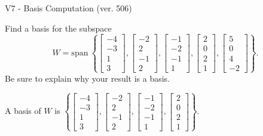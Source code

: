 \begin{exercise}
  \begin{exerciseTitle}V7 - Basis Computation (ver. 506)\end{exerciseTitle}
  \begin{exerciseStatement}
    Find a basis for the subspace 
\[W=\mathrm{span}\ \left\{\left[\begin{array}{r}
-4 \\
-3 \\
1 \\
3
\end{array}\right] , \left[\begin{array}{r}
-2 \\
2 \\
-1 \\
2
\end{array}\right] , \left[\begin{array}{r}
-1 \\
-2 \\
-1 \\
1
\end{array}\right] , \left[\begin{array}{r}
2 \\
0 \\
2 \\
1
\end{array}\right] , \left[\begin{array}{r}
5 \\
0 \\
4 \\
-2
\end{array}\right]\right\}.\]
 Be sure to explain why your result is a basis.


  \end{exerciseStatement}
  \begin{exerciseAnswer}
   A basis of \(W\) is  \(\left\{\left[\begin{array}{r}
-4 \\
-3 \\
1 \\
3
\end{array}\right] , \left[\begin{array}{r}
-2 \\
2 \\
-1 \\
2
\end{array}\right] , \left[\begin{array}{r}
-1 \\
-2 \\
-1 \\
1
\end{array}\right] , \left[\begin{array}{r}
2 \\
0 \\
2 \\
1
\end{array}\right]\right\}\).
  


  \end{exerciseAnswer}
\end{exercise}